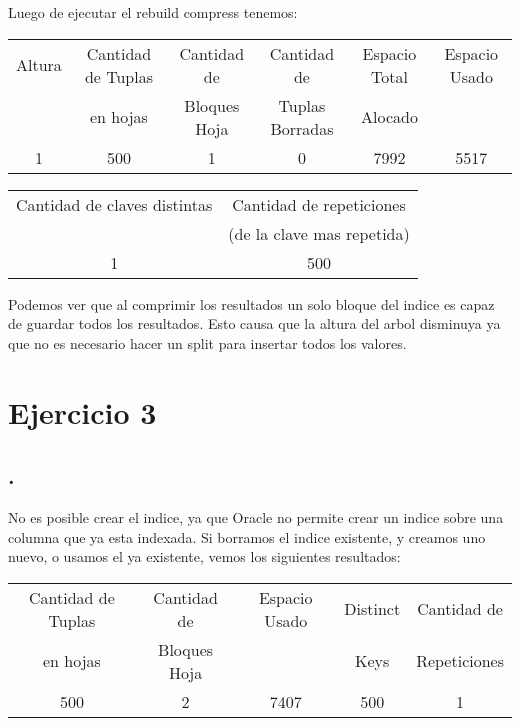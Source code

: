 \documentclass[11pt,a4paper,titlepage,leqno]{article}
\newcommand{\ejercicio}[1]{
    \section*{Ejercicio #1}
    \setcounter{answer}{0}
}
\newcounter{answer}
\newcommand{\parten}[1]{
    \setcounter{answer}{#1}
    \subsection*{\arabic{answer}.}
}
\begin{document}
Luego de ejecutar el rebuild compress tenemos:

\begin{table}[H]
    \centering
    \footnotesize
    \begin{tabular}{c|c|c|c|c|c}
        Altura & Cantidad de Tuplas & Cantidad de & Cantidad de & Espacio Total & Espacio Usado \\
        & en hojas           & Bloques Hoja                & Tuplas Borradas           & Alocado \\
        \hline
        1 & 500 & 1 & 0 & 7992 & 5517 \\
    \end{tabular}
    \label{tbl:ej2-15a}
\end{table}

\begin{table}[H]
    \centering
    \footnotesize
    \begin{tabular}{c|c}
        Cantidad de claves distintas & Cantidad de repeticiones \\
        & (de la clave mas repetida) \\
        \hline
        1 & 500

    \end{tabular}
    \label{tbl:ej2-15b}
\end{table}

Podemos ver que al comprimir los resultados un solo bloque del indice es capaz de guardar todos los resultados. Esto causa que la altura del arbol disminuya ya que no es necesario hacer un split para insertar todos los valores.

\ejercicio{3}

\parten{3}

No es posible crear el indice, ya que Oracle no permite crear un indice sobre una columna que ya esta indexada. Si borramos el indice existente, y creamos uno nuevo, o usamos el ya existente, vemos los siguientes resultados:


\begin{table}[H]
    \centering
    \footnotesize
    \begin{tabular}{c|c|c|c|c}
        Cantidad de Tuplas & Cantidad de & Espacio Usado & Distinct & Cantidad de \\
        en hojas           & Bloques Hoja & & Keys & Repeticiones \\
        \hline
        500 & 2 & 7407 & 500 & 1 \\
    \end{tabular}
    \label{tbl:ej3-3}
\end{table}
\end{document}
